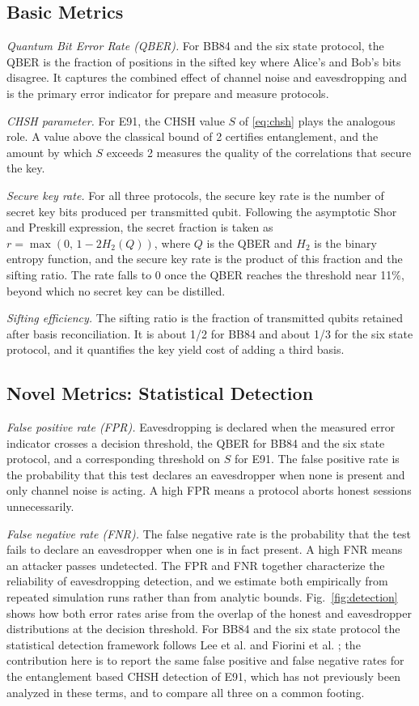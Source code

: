 \documentclass[conference]{IEEEtran}
\begin{document}
\subsection{Basic Metrics}
\textit{Quantum Bit Error Rate (QBER).} For BB84 and the six state protocol, the
QBER is the fraction of positions in the sifted key where Alice's and Bob's bits
disagree. It captures the combined effect of channel noise and eavesdropping and
is the primary error indicator for prepare and measure protocols.

\textit{CHSH parameter.} For E91, the CHSH value $S$ of \eqref{eq:chsh} plays the
analogous role. A value above the classical bound of 2 certifies entanglement,
and the amount by which $S$ exceeds 2 measures the quality of the correlations
that secure the key.

\textit{Secure key rate.} For all three protocols, the secure key rate is the
number of secret key bits produced per transmitted qubit. Following the
asymptotic Shor and Preskill expression, the secret fraction is taken as $r =
\max(0,\, 1 - 2 H_2(Q))$, where $Q$ is the QBER and $H_2$ is the binary entropy
function, and the secure key rate is the product of this fraction and the
sifting ratio. The rate falls to 0 once the QBER reaches the threshold near
11\%, beyond which no secret key can be distilled.

\textit{Sifting efficiency.} The sifting ratio is the fraction of transmitted
qubits retained after basis reconciliation. It is about 1/2 for BB84 and
about 1/3 for the six state protocol, and it quantifies the key yield cost
of adding a third basis.

\subsection{Novel Metrics: Statistical Detection}
\textit{False positive rate (FPR).} Eavesdropping is declared when the measured
error indicator crosses a decision threshold, the QBER for BB84 and the six
state protocol, and a corresponding threshold on $S$ for E91. The false positive
rate is the probability that this test declares an eavesdropper when none is
present and only channel noise is acting. A high FPR means a protocol aborts
honest sessions unnecessarily.

\textit{False negative rate (FNR).} The false negative rate is the probability
that the test fails to declare an eavesdropper when one is in fact present. A
high FNR means an attacker passes undetected. The FPR and FNR together
characterize the reliability of eavesdropping detection, and we estimate both
empirically from repeated simulation runs rather than from analytic bounds. Fig.~\ref{fig:detection} shows how both error rates arise from the overlap of the honest and eavesdropper distributions at the decision threshold. For BB84 and
the six state protocol the statistical detection framework follows Lee et al.
\cite{lee2022eavesdropping} and Fiorini et al. \cite{fiorini2025sixstate}; the
contribution here is to report the same false positive and false negative rates
for the entanglement based CHSH detection of E91, which has not previously been
analyzed in these terms, and to compare all three on a common footing.
\end{document}
